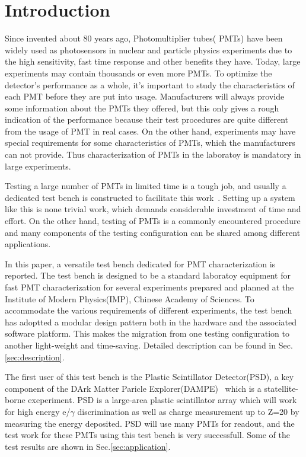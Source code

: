 \documentclass[5p, times]{elsarticle}
\begin{document}
\section{Introduction}
\label{sec:introduction}

Since invented about 80 years ago, Photomultiplier tubes( PMTs) have been widely used as photosensors in nuclear and particle physics experiments due to the high sensitivity, fast time response and other benefits they have.
Today, large experiments may contain thousands or even more PMTs.
To optimize the detector's performance as a whole, it's important to study the characteristics of each PMT before they are put into usage. 
Manufacturers will always provide some information about the PMTs they offered, but this only gives a rough indication of the performance because their test procedures are quite different from the usage of PMT in real cases.
On the other hand, experiments may have special requirements for some characteristics of PMTs, which the manufacturers can not provide. 
Thus characterization of PMTs in the laboratoy is mandatory in large experiments.

Testing a large number of PMTs in limited time is a tough job, and usually a dedicated test bench is constructed to facilitate this work~\cite{barnhill_testing_2008,akgun_complete_2005,adragna_pmt-block_2006}.
Setting up a system like this is none trivial work, which demands considerable investment of time and effort.
On the other hand, testing of PMTs is a commonly encountered procedure and many components of the testing configuration can be shared among different applications.

In this paper, a versatile test bench dedicated for PMT characterization is reported.
The test bench is designed to be a standard laboratoy equipment for fast PMT characterization for several experiments prepared and planned at the Institute of Modern Physics(IMP), Chinese Academy of Sciences.
To accommodate the various requirements of different experiments, the test bench has adoptted a modular design pattern both in the hardware and the associated software platform.
This makes the migration from one testing configuration to another light-weight and time-saving.
Detailed description can be found in Sec.\ref{sec:description}.

The first user of this test bench is the Plastic Scintillator Detector(PSD), a key component of the DArk Matter Paricle Explorer(DAMPE)~\cite{Chang_Jin_dampe} which is a statellite-borne exeperiment. 
PSD is a large-area plastic scintillator array which will work for high energy e/$\gamma$ discrimination as well as charge measurement up to Z=20 by measuring the energy deposited.
PSD will use many PMTs for readout, and the test work for these PMTs using this test bench is very successfull. Some of the test results are shown in Sec.\ref{sec:application}.
\end{document}
